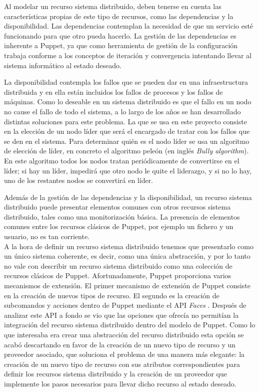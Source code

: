 Al modelar un recurso sistema distribuido, deben tenerse en cuenta las características propias de este tipo de recursos, como las dependencias y la disponibilidad. Las dependencias contemplan la necesidad de que un servicio esté funcionando para que otro pueda hacerlo. La gestión de las dependencias es inherente a Puppet, ya que como herramienta de gestión de la configuración trabaja conforme a los conceptos de iteración y convergencia intentando llevar al sistema informático al estado deseado.

La disponibilidad contempla los fallos que se pueden dar en una infraestructura distribuida y en ella están incluidos los fallos de procesos y los fallos de máquinas. Como lo deseable en un sistema distribuido es que el fallo en un nodo no cause el fallo de todo el sistema, a lo largo de los años se han desarrollado distintas soluciones para este problema. La que se usa en este proyecto consiste en la elección de un nodo líder que será el encargado de tratar con los fallos que se den en el sistema. Para determinar quién es el nodo líder se usa un algoritmo de elección de líder, en concreto el algoritmo peleón (en inglés \emph{Bully algorithm}). En este algoritmo todos los nodos tratan periódicamente de convertirse en el líder; si hay un líder, impedirá que otro nodo le quite el liderazgo, y si no lo hay, uno de los restantes nodos se convertirá en líder.

Además de la gestión de las dependencias y la disponibilidad, un recurso sistema distribuido puede presentar elementos comunes con otros recursos sistema distribuido, tales como una monitorización básica. La presencia de elementos comunes entre los recursos clásicos de Puppet, por ejemplo un fichero y un usuario, no es tan corriente. \\

A la hora de definir un recurso sistema distribuido tenemos que presentarlo como un único sistema coherente, es decir, como una única abstracción, y por lo tanto no vale con describir un recurso sistema distribuido como una colección de recursos clásicos de Puppet. Afortunadamente, Puppet proporciona varios mecanismos de extensión. El primer mecanismo de extensión de Puppet consiste en la creación de nuevos tipos de recurso. El segundo es la creación de subcomandos y acciones dentro de Puppet mediante el API \emph{Faces} \cite{puppet-faces}. Después de analizar este API a fondo se vio que las opciones que ofrecía no permitían la integración del recurso sistema distribuido dentro del modelo de Puppet. Como lo que interesaba era crear una abstracción del recurso distribuido esta opción se acabó descartando en favor de la creación de un nuevo tipo de recurso y un proveedor asociado, que soluciona el problema de una manera más elegante: la creación de un nuevo tipo de recurso con sus atributos correspondientes para definir los recursos sistema distribuido y la creación de un proveedor que implemente los pasos necesarios para llevar dicho recurso al estado deseado.


